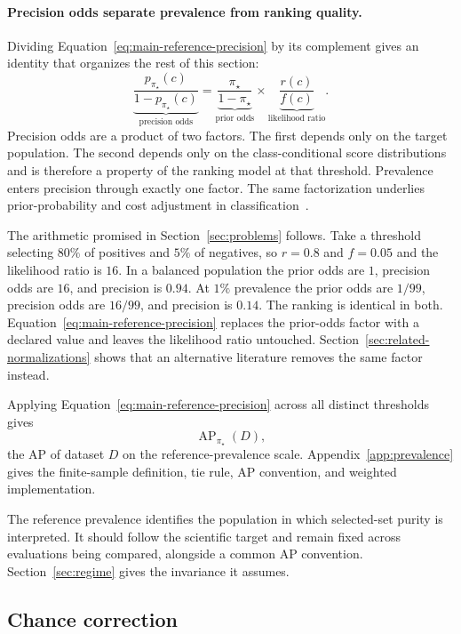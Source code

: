 \documentclass[11pt]{article}
\newcommand{\AP}{\operatorname{AP}}
\theoremstyle{remark}
\begin{document}
\paragraph{Precision odds separate prevalence from ranking quality.}
Dividing Equation~\eqref{eq:main-reference-precision} by its complement gives an identity that organizes the rest of this section:
\begin{equation}
\underbrace{\frac{p_{\pi_\star}(c)}{1-p_{\pi_\star}(c)}}_{\text{precision odds}}
=
\underbrace{\frac{\pi_\star}{1-\pi_\star}}_{\text{prior odds}}
\times
\underbrace{\frac{r(c)}{f(c)}}_{\text{likelihood ratio}}.
\label{eq:odds}
\end{equation}
Precision odds are a product of two factors. The first depends only on the target population. The second depends only on the class-conditional score distributions and is therefore a property of the ranking model at that threshold. Prevalence enters precision through exactly one factor. The same factorization underlies prior-probability and cost adjustment in classification~\cite{elkan2001foundations}.

The arithmetic promised in Section~\ref{sec:problems} follows. Take a threshold selecting $80\%$ of positives and $5\%$ of negatives, so $r=0.8$ and $f=0.05$ and the likelihood ratio is $16$. In a balanced population the prior odds are $1$, precision odds are $16$, and precision is $0.94$. At $1\%$ prevalence the prior odds are $1/99$, precision odds are $16/99$, and precision is $0.14$. The ranking is identical in both. Equation~\eqref{eq:main-reference-precision} replaces the prior-odds factor with a declared value and leaves the likelihood ratio untouched. Section~\ref{sec:related-normalizations} shows that an alternative literature removes the same factor instead.

Applying Equation~\eqref{eq:main-reference-precision} across all distinct thresholds gives
\[
\AP_{\pi_\star}(D),
\]
the AP of dataset $D$ on the reference-prevalence scale. Appendix~\ref{app:prevalence} gives the finite-sample definition, tie rule, AP convention, and weighted implementation.

The reference prevalence identifies the population in which selected-set purity is interpreted. It should follow the scientific target and remain fixed across evaluations being compared, alongside a common AP convention. Section~\ref{sec:regime} gives the invariance it assumes.

\subsection{Chance correction}
\end{document}
